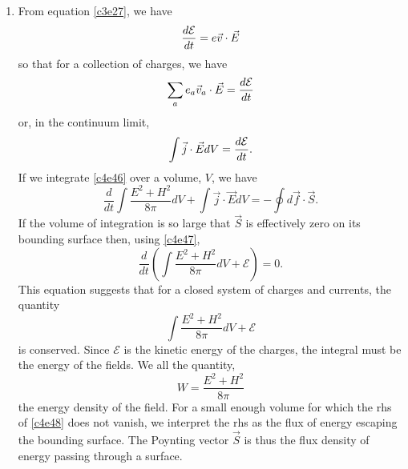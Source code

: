 \begin{enumerate}
\item From equation \eqref{c3e27}, we have
\[
\frac{d{\mathcal{E}}}{d{t}} = e\vec{v}\cdot\vec{E}
\]
so that for a collection of charges, we have
\[
\sum_a e_a\vec{v}_a\cdot\vec{E} = \frac{d{\mathcal{E}}}{d{t}}
\]
or, in the continuum limit,
\begin{equation}\label{c4e47}
\int\vec{j}\cdot\vec{E}dV = \frac{d{\mathcal{E}}}{d{t}}.
\end{equation}
If we integrate \eqref{c4e46} over a volume, $V$, we have
\begin{equation}\label{c4e48}
\frac{d}{dt}\int\frac{E^2 + H^2}{8\pi}dV + 
\int \vec{j}\cdot\vec{E}dV = -\oint d\vec{f}\cdot\vec{S}.
\end{equation}
If the volume of integration is so large that $\vec{S}$ is effectively zero on
its bounding surface then, using \eqref{c4e47},
\begin{equation}\label{c4e49}
\frac{d}{dt}\left(\int\frac{E^2 + H^2}{8\pi}dV + \mathcal{E}\right) = 0.
\end{equation}
This equation suggests that for a closed system of charges and currents,
the quantity
\[
\int\frac{E^2 + H^2}{8\pi}dV + \mathcal{E}
\]
is conserved. Since $\mathcal{E}$ is the kinetic energy of the charges,
the integral must be the energy of the fields. We all the quantity,
\begin{equation}\label{c4e50}
W = \frac{E^2 + H^2}{8\pi}
\end{equation}
the energy density of the field. For a small enough volume for which the rhs of
\eqref{c4e48} does not vanish, we interpret the rhs as the flux of energy 
escaping the bounding surface. The Poynting vector $\vec{S}$ is thus the flux 
density of energy passing through a surface.


\end{enumerate}
